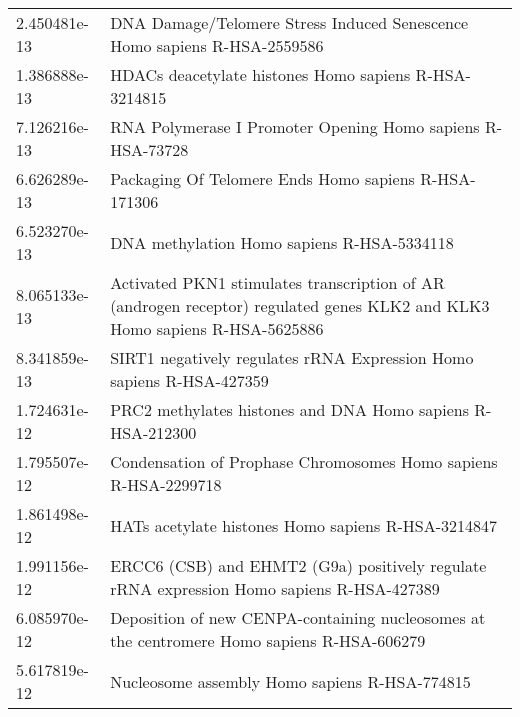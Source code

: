 \begin{longtable}{p{2.4cm}p{14.5cm}}
\bottomrule
\endlastfoot
             2.450481e-13 &                                                              DNA Damage/Telomere Stress Induced Senescence Homo sapiens R-HSA-2559586 \\
             1.386888e-13 &                                                                                 HDACs deacetylate histones Homo sapiens R-HSA-3214815 \\
             7.126216e-13 &                                                                            RNA Polymerase I Promoter Opening Homo sapiens R-HSA-73728 \\
             6.626289e-13 &                                                                                  Packaging Of Telomere Ends Homo sapiens R-HSA-171306 \\
             6.523270e-13 &                                                                                            DNA methylation Homo sapiens R-HSA-5334118 \\
             8.065133e-13 &            Activated PKN1 stimulates transcription of AR (androgen receptor) regulated genes KLK2 and KLK3 Homo sapiens R-HSA-5625886 \\
             8.341859e-13 &                                                                  SIRT1 negatively regulates rRNA Expression Homo sapiens R-HSA-427359 \\
             1.724631e-12 &                                                                            PRC2 methylates histones and DNA Homo sapiens R-HSA-212300 \\
             1.795507e-12 &                                                                       Condensation of Prophase Chromosomes Homo sapiens R-HSA-2299718 \\
             1.861498e-12 &                                                                                    HATs acetylate histones Homo sapiens R-HSA-3214847 \\
             1.991156e-12 &                                             ERCC6 (CSB) and EHMT2 (G9a) positively regulate rRNA expression Homo sapiens R-HSA-427389 \\
             6.085970e-12 &                                            Deposition of new CENPA-containing nucleosomes at the centromere Homo sapiens R-HSA-606279 \\
             5.617819e-12 &                                                                                         Nucleosome assembly Homo sapiens R-HSA-774815 \\

\end{longtable}
